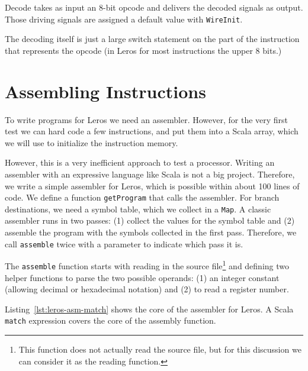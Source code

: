 \documentclass[%
    10pt,
    headinclude, footexclude,
    openright, %
    notitlepage,
    cleardoubleempty,
    headsepline,
    pointlessnumbers,
    bibtotoc, idxtotoc,
    ]{scrbook}
\newcommand{\code}[1]{{\small{\texttt{#1}}}}
\newcommand{\todo}[1]{{\emph{TODO: #1}}}
\renewcommand{\todo}[1]{}
\begin{document}

\noindent Decode takes as input an 8-bit opcode and delivers the decoded signals
as output. Those driving signals are assigned a default value with \code{WireInit}.


\noindent The decoding itself is just a large switch statement on the part of the
instruction that represents the opcode (in Leros for most instructions the upper
8 bits.)


\section{Assembling Instructions}

To write programs for Leros we need an assembler. However, for the very first
test we can hard code a few instructions, and put them into a Scala array,
which we will use to initialize the instruction memory.


\noindent However, this is a very inefficient approach to test a processor.
Writing an assembler with an expressive language like Scala is not a big project.
Therefore, we write a simple assembler for Leros, which is possible within about
100 lines of code. We define a function \code{getProgram} that calls the assembler.
For branch destinations, we need a symbol table, which we collect in a \code{Map}.
A classic assembler runs in two passes: (1) collect the values for the symbol table
and (2) assemble the program with the symbols collected in the first pass.
Therefore, we call \code{assemble} twice with a parameter to indicate which pass it is.


The \code{assemble} function starts with reading in the source
file\footnote{This function does not actually read the source file, but for this
discussion we can consider it as the reading function.}
and defining two helper functions to parse the two possible operands: (1) an
integer constant (allowing decimal or hexadecimal notation) and (2) to read
a register number.


Listing~\ref{lst:leros-asm-match} shows the core of the assembler for Leros.
A Scala \code{match} expression covers the core of the assembly function.
\todo{Some more words on the code.}
\end{document}
